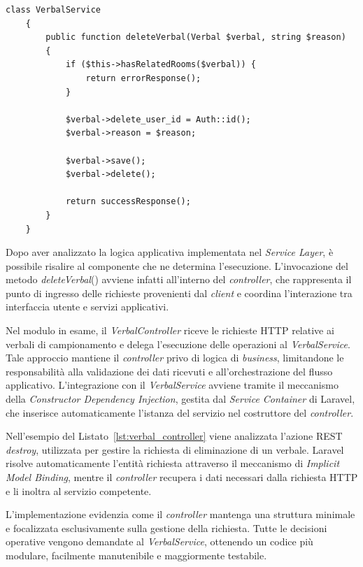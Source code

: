 \begin{lstlisting}[float=!t, caption={Implementazione della logica di eliminazione logica nel Service Layer.}, captionpos=b, label={lst:verbal_service_delete}, basicstyle=\ttfamily\footnotesize]
	class VerbalService
	{
		public function deleteVerbal(Verbal $verbal, string $reason)
		{
			if ($this->hasRelatedRooms($verbal)) {
				return errorResponse();
			}
			
			$verbal->delete_user_id = Auth::id();
			$verbal->reason = $reason;
			
			$verbal->save();
			$verbal->delete();
			
			return successResponse();
		}
	}
\end{lstlisting}

Dopo aver analizzato la logica applicativa implementata nel \textit{Service Layer}, è possibile risalire al componente che ne determina l'esecuzione. L'invocazione del metodo \textit{deleteVerbal}() avviene infatti all'interno del \textit{controller}, che rappresenta il punto di ingresso delle richieste provenienti dal \textit{client} e coordina l'interazione tra interfaccia utente e servizi applicativi.

Nel modulo in esame, il \textit{VerbalController} riceve le richieste HTTP relative ai verbali di campionamento e delega l'esecuzione delle operazioni al \textit{VerbalService}. Tale approccio mantiene il \textit{controller} privo di logica di \textit{business}, limitandone le responsabilità alla validazione dei dati ricevuti e all'orchestrazione del flusso applicativo. L'integrazione con il \textit{VerbalService} avviene tramite il meccanismo della \textit{Constructor Dependency Injection}, gestita dal \textit{Service Container} di Laravel, che inserisce automaticamente l'istanza del servizio nel costruttore del \textit{controller}.

Nell'esempio del Listato~\ref{lst:verbal_controller} viene analizzata l'azione REST \textit{destroy}, utilizzata per gestire la richiesta di eliminazione di un verbale. Laravel risolve automaticamente l'entità richiesta attraverso il meccanismo di \textit{Implicit Model Binding}, mentre il \textit{controller} recupera i dati necessari dalla richiesta HTTP e li inoltra al servizio competente.

L'implementazione evidenzia come il \textit{controller} mantenga una struttura minimale e focalizzata esclusivamente sulla gestione della richiesta. Tutte le decisioni operative vengono demandate al \textit{VerbalService}, ottenendo un codice più modulare, facilmente manutenibile e maggiormente testabile.


